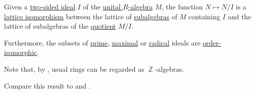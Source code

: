 \begin{theorem}\label{thm:quotient_ideal_lattice_theorem}
  Given a \hyperref[def:semiring_ideal]{two-sided ideal} \( I \) of the \hyperref[def:algebra_over_ring]{unital \( R \)-algebra} \( M \), the function \( N \mapsto N / I \) is a \hyperref[def:semilattice/homomorphism]{lattice isomorphism} between the lattice of \hyperref[def:ring/submodel]{subalgebras} of \( M \) containing \( I \) and the lattice of subalgebras of the \hyperref[def:ring/quotient]{quotient} \( M / I \).

  Furthermore, the subsets of \hyperref[def:semiring_ideal/prime]{prime}, \hyperref[def:semiring_ideal/maximal]{maximal} or \hyperref[def:radical_ideal]{radical} ideals are \hyperref[def:partially_ordered_set/homomorphism]{order-isomorphic}.

  Note that, by , usual rings can be regarded as \( \BbbZ \)-algebras.

  Compare this result to  and .
\end{theorem}
